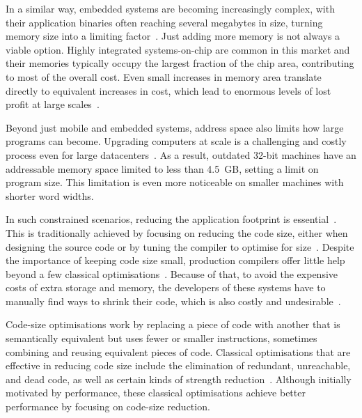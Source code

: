 In a similar way, embedded systems are becoming increasingly complex, with their application binaries often reaching several megabytes in size, turning memory size into a limiting factor~\cite{plaza18}.
Just adding more memory is not always a viable option.
Highly integrated systems-on-chip are common in this market and their memories typically occupy the largest fraction of the chip area, contributing to most of the overall cost.
Even small increases in memory area translate directly to equivalent increases in cost, which lead to enormous levels of lost profit at large scales~\cite{edler10}.

Beyond just mobile and embedded systems, address space also limits how large programs can become.
Upgrading computers at scale is a challenging and costly process even for large datacenters~\cite{yan16,neamtiu11}.
As a result, outdated 32-bit machines have an addressable memory space limited to less than 4.5~GB, setting a limit on program size.
This limitation is even more noticeable on smaller machines with shorter word widths.

In such constrained scenarios, reducing the application footprint is essential~\cite{schultz03,varma04,sehgal12,keoh14,auler17}.
This is traditionally achieved by focusing on reducing the code size, either when designing the source code or by tuning the compiler to optimise for size~\cite{fisher05,sehgal12,hennessy17,rocha19}.
Despite the importance of keeping code size small, production compilers offer little help beyond a few classical optimisations~\cite{cocke70,briggs97,debray00}.
Because of that, to avoid the expensive costs of extra storage and memory, the developers of these systems have to manually find ways to shrink their code, which is also costly and undesirable~\cite{keoh14,weaver09}.

Code-size optimisations work by replacing a piece of code with another that is semantically equivalent but uses fewer or smaller instructions, sometimes combining and reusing equivalent pieces of code.
Classical optimisations that are effective in reducing code size include the elimination of redundant, unreachable, and dead code, as well as certain kinds of strength reduction~\cite{cocke70,briggs97,debray00}.
Although initially motivated by performance, these classical optimisations achieve better performance by focusing on code-size reduction.

